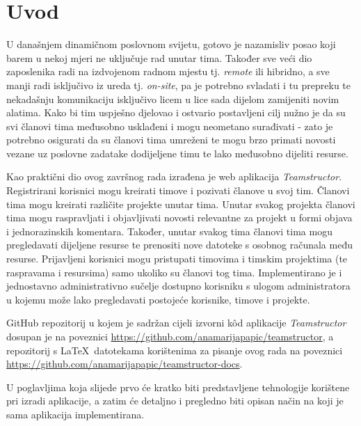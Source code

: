 \section{Uvod}
U današnjem dinamičnom poslovnom svijetu, gotovo je nazamisliv posao koji barem u nekoj mjeri ne uključuje rad unutar tima. Također sve veći dio zaposlenika radi na izdvojenom radnom mjestu tj. \textit{remote} ili hibridno, a sve manji radi isključivo iz ureda tj. \textit{on-site}, pa je potrebno svladati i tu prepreku te nekadašnju komunikaciju isključivo licem u lice sada dijelom zamijeniti novim alatima. Kako bi tim uspješno djelovao i ostvario postavljeni cilj nužno je da su svi članovi tima međusobno usklađeni i mogu neometano surađivati - zato je potrebno osigurati da su članovi tima umreženi te mogu brzo primati novosti vezane uz poslovne zadatake dodijeljene timu te lako međusobno dijeliti resurse.

Kao praktični dio ovog završnog rada izrađena je web aplikacija \textit{Teamstructor}. Registrirani korisnici mogu kreirati timove i pozivati članove u svoj tim. Članovi tima mogu kreirati različite projekte unutar tima. Unutar svakog projekta članovi tima mogu raspravljati i objavljivati novosti relevantne za projekt u formi objava i jednorazinskih komentara. Također, unutar svakog tima članovi tima mogu pregledavati dijeljene resurse te prenositi nove datoteke s osobnog računala među resurse. Prijavljeni korisnici mogu pristupati timovima i timskim projektima (te raspravama i resursima) samo ukoliko su članovi tog tima. Implementirano je i jednostavno administrativno sučelje dostupno korisniku s ulogom administratora u kojemu može lako pregledavati postojeće korisnike, timove i projekte.

GitHub repozitorij u kojem je sadržan cijeli izvorni k\^od aplikacije \textit{Teamstructor} dosupan je na poveznici \url{https://github.com/anamarijapapic/teamstructor}, a repozitorij s \LaTeX \ datotekama korištenima za pisanje ovog rada na poveznici \url{https://github.com/anamarijapapic/teamstructor-docs}.

U poglavljima koja slijede prvo će kratko biti predstavljene tehnologije korištene pri izradi aplikacije, a zatim će detaljno i pregledno biti opisan način na koji je sama aplikacija implementirana.
